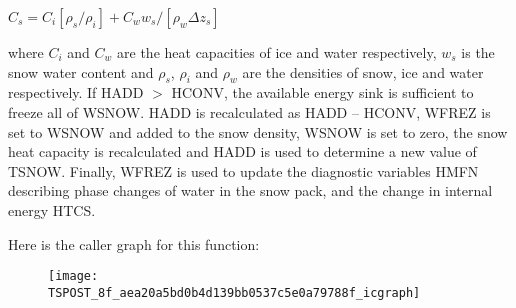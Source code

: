 $C_s = C_i [\rho_s /\rho_i] + C_w w_s/[\rho_w \Delta z_s]$

where $C_i$ and $C_w$ are the heat capacities of ice and water respectively, $w_s$ is the snow water content and $\rho_s$, $\rho_i$ and $\rho_w$ are the densities of snow, ice and water respectively. If H\+A\+D\+D $>$ H\+C\+O\+N\+V, the available energy sink is sufficient to freeze all of W\+S\+N\+O\+W. H\+A\+D\+D is recalculated as H\+A\+D\+D – H\+C\+O\+N\+V, W\+F\+R\+E\+Z is set to W\+S\+N\+O\+W and added to the snow density, W\+S\+N\+O\+W is set to zero, the snow heat capacity is recalculated and H\+A\+D\+D is used to determine a new value of T\+S\+N\+O\+W. Finally, W\+F\+R\+E\+Z is used to update the diagnostic variables H\+M\+F\+N describing phase changes of water in the snow pack, and the change in internal energy H\+T\+C\+S.

Here is the caller graph for this function\+:\nopagebreak
\begin{figure}[H]
\begin{center}
\leavevmode
\texttt{[image: TSPOST\_8f\_aea20a5bd0b4d139bb0537c5e0a79788f\_icgraph]}
\end{center}
\end{figure}


